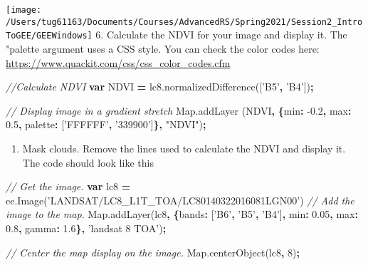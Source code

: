 \documentclass[]{article}
\newenvironment{Shaded}{\begin{snugshade}}{\end{snugshade}}
\newcommand{\AttributeTok}[1]{\textcolor[rgb]{0.77,0.63,0.00}{#1}}
\newcommand{\CommentTok}[1]{\textcolor[rgb]{0.56,0.35,0.01}{\textit{#1}}}
\newcommand{\DataTypeTok}[1]{\textcolor[rgb]{0.13,0.29,0.53}{#1}}
\newcommand{\DecValTok}[1]{\textcolor[rgb]{0.00,0.00,0.81}{#1}}
\newcommand{\FloatTok}[1]{\textcolor[rgb]{0.00,0.00,0.81}{#1}}
\newcommand{\KeywordTok}[1]{\textcolor[rgb]{0.13,0.29,0.53}{\textbf{#1}}}
\newcommand{\NormalTok}[1]{#1}
\newcommand{\OperatorTok}[1]{\textcolor[rgb]{0.81,0.36,0.00}{\textbf{#1}}}
\newcommand{\StringTok}[1]{\textcolor[rgb]{0.31,0.60,0.02}{#1}}
\newcommand{\VariableTok}[1]{\textcolor[rgb]{0.00,0.00,0.00}{#1}}
\providecommand{\tightlist}{%
  \setlength{\itemsep}{0pt}\setlength{\parskip}{0pt}}
\begin{document}
\texttt{[image: /Users/tug61163/Documents/Courses/AdvancedRS/Spring2021/Session2\_IntroToGEE/GEEWindows]}
6. Calculate the NDVI for your image and display it. The "palette
argument uses a CSS style. You can check the color codes here:
\url{https://www.quackit.com/css/css_color_codes.cfm}

\begin{Shaded}
\begin{Highlighting}[]
\CommentTok{//Calculate NDVI}
\KeywordTok{var}\NormalTok{ NDVI }\OperatorTok{=} \VariableTok{lc8}\NormalTok{.}\AttributeTok{normalizedDifference}\NormalTok{([}\StringTok{'B5'}\OperatorTok{,} \StringTok{'B4'}\NormalTok{])}\OperatorTok{;}

\CommentTok{// Display image in a gradient stretch}
\VariableTok{Map}\NormalTok{.}\AttributeTok{addLayer}\NormalTok{ (NDVI}\OperatorTok{,} \OperatorTok{\{}\DataTypeTok{min}\OperatorTok{:} \FloatTok{-0.2}\OperatorTok{,} \DataTypeTok{max}\OperatorTok{:} \FloatTok{0.5}\OperatorTok{,} \DataTypeTok{palette}\OperatorTok{:}\NormalTok{ [}\StringTok{'FFFFFF'}\OperatorTok{,} \StringTok{'339900'}\NormalTok{]}\OperatorTok{\},} \StringTok{"NDVI"}\NormalTok{)}\OperatorTok{;}
\end{Highlighting}
\end{Shaded}

\begin{enumerate}
\def\labelenumi{\arabic{enumi}.}
\setcounter{enumi}{6}
\tightlist
\item
  Mask clouds. Remove the lines used to calculate the NDVI and display
  it. The code should look like this
\end{enumerate}

\begin{Shaded}
\begin{Highlighting}[]
\CommentTok{// Get the image.}
\KeywordTok{var}\NormalTok{ lc8 }\OperatorTok{=} \VariableTok{ee}\NormalTok{.}\AttributeTok{Image}\NormalTok{(}\StringTok{'LANDSAT/LC8_L1T_TOA/LC80140322016081LGN00'}\NormalTok{)}
\CommentTok{// Add the image to the map.}
\VariableTok{Map}\NormalTok{.}\AttributeTok{addLayer}\NormalTok{(lc8}\OperatorTok{,}
\OperatorTok{\{}\DataTypeTok{bands}\OperatorTok{:}\NormalTok{ [}\StringTok{'B6'}\OperatorTok{,} \StringTok{'B5'}\OperatorTok{,} \StringTok{'B4'}\NormalTok{]}\OperatorTok{,} \DataTypeTok{min}\OperatorTok{:} \FloatTok{0.05}\OperatorTok{,} \DataTypeTok{max}\OperatorTok{:} \FloatTok{0.8}\OperatorTok{,} \DataTypeTok{gamma}\OperatorTok{:} \FloatTok{1.6}\OperatorTok{\},} \StringTok{'landsat 8 TOA'}\NormalTok{)}\OperatorTok{;}

\CommentTok{// Center the map display on the image.}
\VariableTok{Map}\NormalTok{.}\AttributeTok{centerObject}\NormalTok{(lc8}\OperatorTok{,} \DecValTok{8}\NormalTok{)}\OperatorTok{;}
\end{Highlighting}
\end{Shaded}
\end{document}
